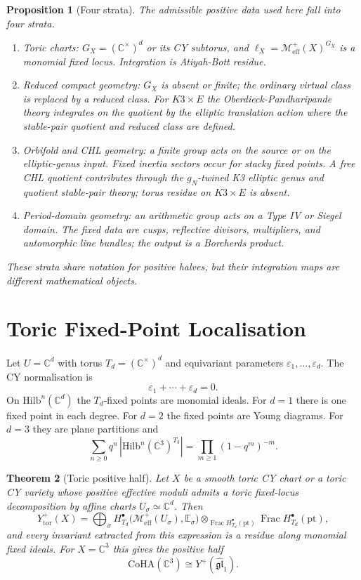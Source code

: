 \documentclass[11pt]{amsart}
\providecommand{\C}{\mathbb{C}}
\providecommand{\eps}{\varepsilon}
\providecommand{\Hilb}{\mathrm{Hilb}}
\providecommand{\CoHA}{\mathrm{CoHA}}
\providecommand{\cM}{\mathcal{M}}
\providecommand{\Meff}{\cM^{+}_{\mathrm{eff}}}
\providecommand{\Yp}{Y^{+}}
\providecommand{\Yph}{Y^{+}(\widehat{\mathfrak{gl}}_1)}
\theoremstyle{plain}
\newtheorem{theorem}{Theorem}[section]
\newtheorem{proposition}[theorem]{Proposition}
\theoremstyle{definition}
\theoremstyle{remark}
\begin{document}
\begin{proposition}[Four strata]\label{prop:four-equivariance-strata}
The admissible positive data used here fall into four strata.
\begin{enumerate}
\item Toric charts: $G_X=(\C^\times)^d$ or its CY subtorus, and
$\ell_X=\Meff(X)^{G_X}$ is a monomial fixed locus. Integration is
Atiyah-Bott residue.
\item Reduced compact geometry: $G_X$ is absent or finite; the ordinary
virtual class is replaced by a reduced class. For $K3\times E$ the
Oberdieck-Pandharipande theory integrates on the quotient by the elliptic
translation action where the stable-pair quotient and reduced class are
defined.
\item Orbifold and CHL geometry: a finite group acts on the source or on
the elliptic-genus input. Fixed inertia sectors occur for stacky fixed
points. A free CHL quotient contributes through the $g_N$-twined K3
elliptic genus and quotient stable-pair theory; torus residue on
$K3\times E$ is absent.
\item Period-domain geometry: an arithmetic group acts on a Type IV or
Siegel domain. The fixed data are cusps, reflective divisors, multipliers,
and automorphic line bundles; the output is a Borcherds product.
\end{enumerate}
These strata share notation for positive halves, but their integration
maps are different mathematical objects.
\end{proposition}

\section{Toric Fixed-Point Localisation}

Let $U=\C^d$ with torus $T_d=(\C^\times)^d$ and equivariant parameters
$\eps_1,\ldots,\eps_d$. The CY normalisation is
\[
 \eps_1+\cdots+\eps_d=0 .
\]
On $\Hilb^n(\C^d)$ the $T_d$-fixed points are monomial ideals. For
$d=1$ there is one fixed point in each degree. For $d=2$ the fixed
points are Young diagrams. For $d=3$ they are plane partitions and
\[
 \sum_{n\geq0} q^n\,|\Hilb^n(\C^3)^{T_3}|
 =
 \prod_{m\geq1}(1-q^m)^{-m}.
\]

\begin{theorem}[Toric positive half]\label{thm:toric-positive-half}
Let $X$ be a smooth toric CY chart or a toric CY variety whose positive
effective moduli admits a toric fixed-locus decomposition by affine
charts $U_\sigma\simeq \C^d$. Then
\[
 \Yp_{\mathrm{tor}}(X)
 =
 \bigoplus_{\sigma}
 H^\bullet_{T_d}\bigl(\Meff(U_\sigma),\mathbb E_\sigma\bigr)
 \otimes_{\operatorname{Frac}H^\bullet_{T_d}(\mathrm{pt})}
 \operatorname{Frac}H^\bullet_{T_d}(\mathrm{pt}),
\]
and every invariant extracted from this expression is a residue along
monomial fixed ideals. For $X=\C^3$ this gives the positive half
\[
 \CoHA(\C^3)\cong\Yph .
\]
\end{theorem}
\end{document}
